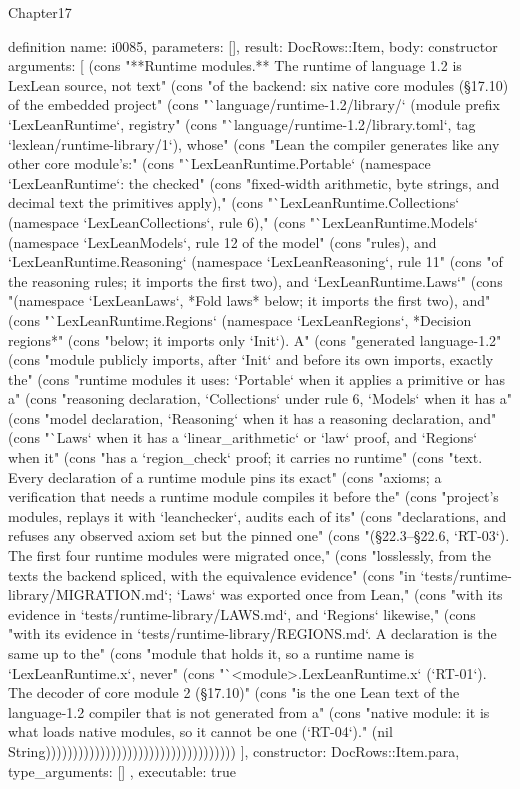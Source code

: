 \begin{lexlean}{Chapter17}
\begin{semanticmodule}
definition{
  name: i0085,
  parameters: [],
  result: DocRows::Item,
  body: constructor{
    arguments: [
      (cons "**Runtime modules.** The runtime of language 1.2 is LexLean source, not text" (cons "of the backend: six native core modules (§17.10) of the embedded project" (cons "`language/runtime-1.2/library/` (module prefix `LexLeanRuntime`, registry" (cons "`language/runtime-1.2/library.toml`, tag `lexlean/runtime-library/1`), whose" (cons "Lean the compiler generates like any other core module's:" (cons "`LexLeanRuntime.Portable` (namespace `LexLeanRuntime`: the checked" (cons "fixed-width arithmetic, byte strings, and decimal text the primitives apply)," (cons "`LexLeanRuntime.Collections` (namespace `LexLeanCollections`, rule 6)," (cons "`LexLeanRuntime.Models` (namespace `LexLeanModels`, rule 12 of the model" (cons "rules), and `LexLeanRuntime.Reasoning` (namespace `LexLeanReasoning`, rule 11" (cons "of the reasoning rules; it imports the first two), and `LexLeanRuntime.Laws`" (cons "(namespace `LexLeanLaws`, *Fold laws* below; it imports the first two), and" (cons "`LexLeanRuntime.Regions` (namespace `LexLeanRegions`, *Decision regions*" (cons "below; it imports only `Init`). A" (cons "generated language-1.2" (cons "module publicly imports, after `Init` and before its own imports, exactly the" (cons "runtime modules it uses: `Portable` when it applies a primitive or has a" (cons "reasoning declaration, `Collections` under rule 6, `Models` when it has a" (cons "model declaration, `Reasoning` when it has a reasoning declaration, and" (cons "`Laws` when it has a `linear_arithmetic` or `law` proof, and `Regions` when it" (cons "has a `region_check` proof; it carries no runtime" (cons "text. Every declaration of a runtime module pins its exact" (cons "axioms; a verification that needs a runtime module compiles it before the" (cons "project's modules, replays it with `leanchecker`, audits each of its" (cons "declarations, and refuses any observed axiom set but the pinned one" (cons "(§22.3–§22.6, `RT-03`). The first four runtime modules were migrated once," (cons "losslessly, from the texts the backend spliced, with the equivalence evidence" (cons "in `tests/runtime-library/MIGRATION.md`; `Laws` was exported once from Lean," (cons "with its evidence in `tests/runtime-library/LAWS.md`, and `Regions` likewise," (cons "with its evidence in `tests/runtime-library/REGIONS.md`. A declaration is the same up to the" (cons "module that holds it, so a runtime name is `LexLeanRuntime.x`, never" (cons "`<module>.LexLeanRuntime.x` (`RT-01`). The decoder of core module 2 (§17.10)" (cons "is the one Lean text of the language-1.2 compiler that is not generated from a" (cons "native module: it is what loads native modules, so it cannot be one (`RT-04`)." (nil String)))))))))))))))))))))))))))))))))))
    ],
    constructor: DocRows::Item.para,
    type_arguments: []
  },
  executable: true
}


\end{semanticmodule}
\end{lexlean}
